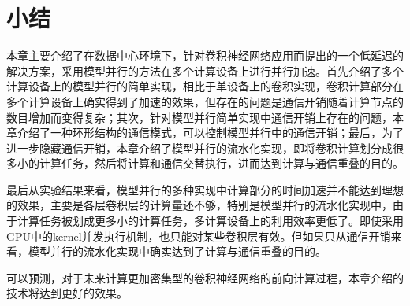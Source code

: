 \section{小结}
本章主要介绍了在数据中心环境下，针对卷积神经网络应用而提出的一个低延迟的解决方案，采用模型并行的方法在多个计算设备上进行并行加速。首先介绍了多个计算设备上的模型并行的简单实现，相比于单设备上的卷积实现，卷积计算部分在多个计算设备上确实得到了加速的效果，但存在的问题是通信开销随着计算节点的数目增加而变得复杂；其次，针对模型并行简单实现中通信开销上存在的问题，本章介绍了一种环形结构的通信模式，可以控制模型并行中的通信开销；最后，为了进一步隐藏通信开销，本章介绍了模型并行的流水化实现，即将卷积计算划分成很多小的计算任务，然后将计算和通信交替执行，进而达到计算与通信重叠的目的。

最后从实验结果来看，模型并行的多种实现中计算部分的时间加速并不能达到理想的效果，主要是各层卷积层的计算量还不够，特别是模型并行的流水化实现中，由于计算任务被划成更多小的计算任务，多计算设备上的利用效率更低了。即使采用GPU中的kernel并发执行机制，也只能对某些卷积层有效。但如果只从通信开销来看，模型并行的流水化实现中确实达到了计算与通信重叠的目的。

可以预测，对于未来计算更加密集型的卷积神经网络的前向计算过程，本章介绍的技术将达到更好的效果。






